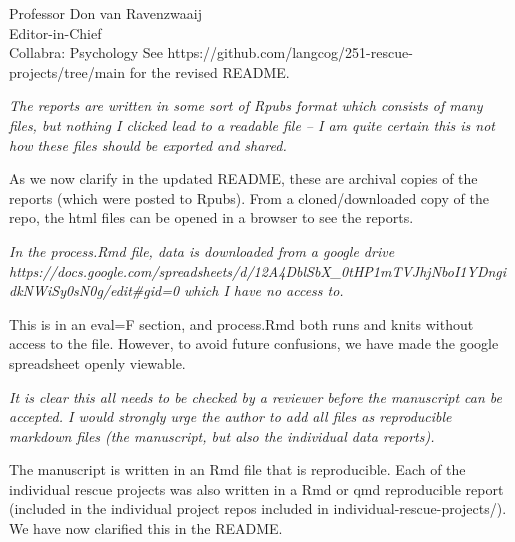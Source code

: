 \documentclass{stanfordletter}
\newcommand{\theysaid}[1]{\begin{leftbar} \noindent 
		\textsl{ #1}\end{leftbar}}
\newcommand{\revised}[1]{\begin{quote}	#1 \end{quote}}
\begin{document}
\begin{letter}{Professor Don van Ravenzwaaij \\ Editor-in-Chief \\ Collabra: Psychology }
		See  https://github.com/langcog/251-rescue-projects/tree/main for the revised README. 
		
		\theysaid{The reports are written in some sort of Rpubs format which consists of many files, but nothing I clicked lead to a readable file – I am quite certain this is not how these files should be exported and shared.}
		
		As we now clarify in the updated README, these are archival copies of the reports (which were posted to Rpubs). From a cloned/downloaded copy of the repo, the html files can be opened in a browser to see the reports.
		
		 		
		
		\theysaid{In the process.Rmd file, data is downloaded from a google drive https://docs.google.com/spreadsheets/d/12A4DblSbX\_0tHP1mTVJhjNboI1YDngidkNWiSy0sN0g/edit\#gid=0 which I have no access to. }
		
		This is in an eval=F section, and process.Rmd both runs and knits without access to the file. However, to avoid future confusions, we have made the google spreadsheet openly viewable. 
		
		\theysaid{It is clear this all needs to be checked by a reviewer before the manuscript can be accepted. I would strongly urge the author to add all files as reproducible markdown files (the manuscript, but also the individual data reports).}
		
		The manuscript is written in an Rmd file that is reproducible. Each of the individual rescue projects was also written in a Rmd or qmd reproducible report (included in the individual project repos included in individual-rescue-projects/). We have now clarified this in the README. 
		
			

\end{letter}
\end{document}
